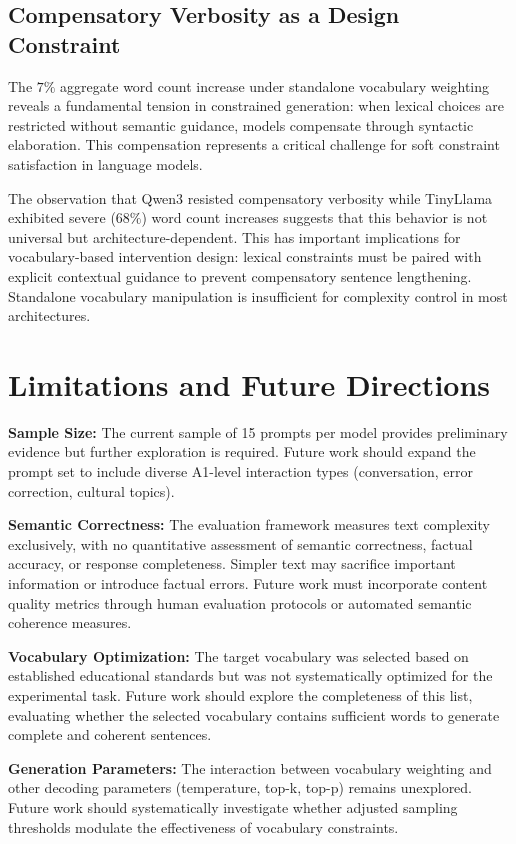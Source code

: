 \documentclass[10pt, a4paper]{article}
\begin{document}
\subsection{Compensatory Verbosity as a Design Constraint}

The $7\%$ aggregate word count increase under standalone vocabulary weighting reveals a fundamental tension in constrained generation: when lexical choices are restricted without semantic guidance, models compensate through syntactic elaboration. This compensation represents a critical challenge for soft constraint satisfaction in language models.

The observation that Qwen3 resisted compensatory verbosity while TinyLlama exhibited severe ($68\%$) word count increases suggests that this behavior is not universal but architecture-dependent. This has important implications for vocabulary-based intervention design: lexical constraints must be paired with explicit contextual guidance to prevent compensatory sentence lengthening. Standalone vocabulary manipulation is insufficient for complexity control in most architectures.

\section{Limitations and Future Directions}

\textbf{Sample Size:} The current sample of 15 prompts per model provides preliminary evidence but further exploration is required. Future work should expand the prompt set to include diverse A1-level interaction types (conversation, error correction, cultural topics).

\textbf{Semantic Correctness:} The evaluation framework measures text complexity exclusively, with no quantitative assessment of semantic correctness, factual accuracy, or response completeness. Simpler text may sacrifice important information or introduce factual errors. Future work must incorporate content quality metrics through human evaluation protocols or automated semantic coherence measures.

\textbf{Vocabulary Optimization:} The target vocabulary was selected based on established educational standards but was not systematically optimized for the experimental task. Future work should explore the completeness of this list, evaluating whether the selected vocabulary contains sufficient words to generate complete and coherent sentences.

\textbf{Generation Parameters:} The interaction between vocabulary weighting and other decoding parameters (temperature, top-k, top-p) remains unexplored. Future work should systematically investigate whether adjusted sampling thresholds modulate the effectiveness of vocabulary constraints.
\end{document}
